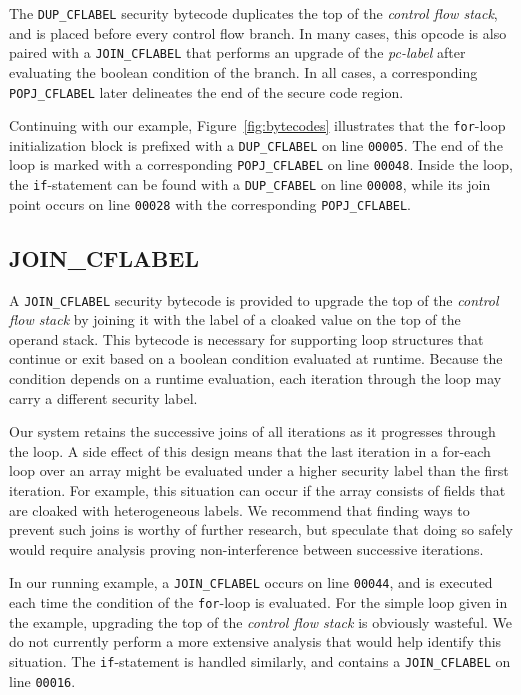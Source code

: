 \documentclass{llncs}
\begin{document}
The \texttt{DUP\_CFLABEL} security bytecode duplicates the top of the \textit{control flow stack}, and is placed before every control flow branch.
In many cases, this opcode is also paired with a \texttt{JOIN\_CFLABEL} that performs an upgrade of the \textit{pc-label} after evaluating the boolean condition of the branch.
In all cases, a corresponding \texttt{POPJ\_CFLABEL} later delineates the end of the secure code region.

Continuing with our example, Figure~\ref{fig:bytecodes} illustrates that the \texttt{for}-loop initialization block is prefixed with a \texttt{DUP\_CFLABEL} on line \texttt{00005}.
The end of the loop is marked with a corresponding \texttt{POPJ\_CFLABEL} on line \texttt{00048}.
Inside the loop, the \texttt{if}-statement can be found with a \texttt{DUP\_CFABEL} on line \texttt{00008}, while its join point occurs on line \texttt{00028} with the corresponding \texttt{POPJ\_CFLABEL}.

\subsection{JOIN\_CFLABEL}
\label{sec:join-cflabel}

A \texttt{JOIN\_CFLABEL} security bytecode is provided to upgrade the top of the \textit{control flow stack} by joining it with the label of a cloaked value on the top of the operand stack.
This bytecode is necessary for supporting loop structures that continue or exit based on a boolean condition evaluated at runtime.
Because the condition depends on a runtime evaluation, each iteration through the loop may carry a different security label.

Our system retains the successive joins of all iterations as it progresses through the loop.
A side effect of this design means that the last iteration in a for-each loop over an array might be evaluated under a higher security label than the first iteration.
For example, this situation can occur if the array consists of fields that are cloaked with heterogeneous labels.
We recommend that finding ways to prevent such joins is worthy of further research, but speculate that doing so safely would require analysis proving non-interference between successive iterations.

In our running example, a \texttt{JOIN\_CFLABEL} occurs on line \texttt{00044}, and is executed each time the condition of the \texttt{for}-loop is evaluated.
For the simple loop given in the example, upgrading the top of the \textit{control flow stack} is obviously wasteful.
We do not currently perform a more extensive analysis that would help identify this situation.
The \texttt{if}-statement is handled similarly, and contains a \texttt{JOIN\_CFLABEL} on line \texttt{00016}.
\end{document}

